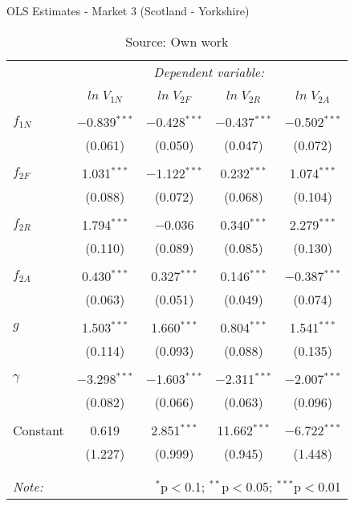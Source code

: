 
\begin{table}[!htbp] \centering 
  \caption{OLS Estimates - Market 3 (Scotland - Yorkshire)} 
  \label{} 
\begin{tabular}{@{\extracolsep{5pt}}lcccc} 
\toprule 
 & \multicolumn{4}{c}{\textit{Dependent variable:}} \\ 
\cline{2-5} 
\\[-1.8ex] & $ln \; V_{1N}$ & $ln \; V_{2F}$ & $ln \; V_{2R}$ & $ln \; V_{2A}$ \\ 
\hline \\[-1.8ex] 
 $f_{1N}$ & $-$0.839$^{***}$ & $-$0.428$^{***}$ & $-$0.437$^{***}$ & $-$0.502$^{***}$ \\ 
  & (0.061) & (0.050) & (0.047) & (0.072) \\ 
  & & & & \\ 
 $f_{2F}$ & 1.031$^{***}$ & $-$1.122$^{***}$ & 0.232$^{***}$ & 1.074$^{***}$ \\ 
  & (0.088) & (0.072) & (0.068) & (0.104) \\ 
  & & & & \\ 
 $f_{2R}$ & 1.794$^{***}$ & $-$0.036 & 0.340$^{***}$ & 2.279$^{***}$ \\ 
  & (0.110) & (0.089) & (0.085) & (0.130) \\ 
  & & & & \\ 
 $f_{2A}$ & 0.430$^{***}$ & 0.327$^{***}$ & 0.146$^{***}$ & $-$0.387$^{***}$ \\ 
  & (0.063) & (0.051) & (0.049) & (0.074) \\ 
  & & & & \\ 
 $g$ & 1.503$^{***}$ & 1.660$^{***}$ & 0.804$^{***}$ & 1.541$^{***}$ \\ 
  & (0.114) & (0.093) & (0.088) & (0.135) \\ 
  & & & & \\ 
 $\gamma$ & $-$3.298$^{***}$ & $-$1.603$^{***}$ & $-$2.311$^{***}$ & $-$2.007$^{***}$ \\ 
  & (0.082) & (0.066) & (0.063) & (0.096) \\ 
  & & & & \\ 
 Constant & 0.619 & 2.851$^{***}$ & 11.662$^{***}$ & $-$6.722$^{***}$ \\ 
  & (1.227) & (0.999) & (0.945) & (1.448) \\ 
  & & & & \\ 
\hline 
\hline \\[-1.8ex] 
\textit{Note:}  & & \multicolumn{3}{r}{$^{*}$p$<$0.1; $^{**}$p$<$0.05; $^{***}$p$<$0.01} \\ 
\bottomrule 
\end{tabular}
\caption*{Source: Own work} 
\end{table} 
